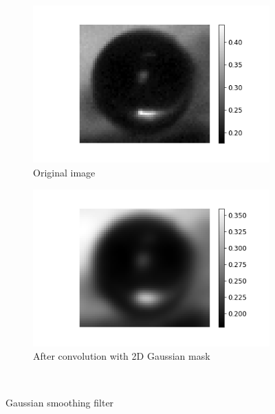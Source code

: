 \begin{figure}
		    \begin{subfigure}[t]{0.3\textwidth}
		        \includegraphics[width=\textwidth]{images/green_one.png}
		        \caption{Original image}
		    \end{subfigure}
			  \begin{subfigure}[t]{0.3\textwidth}
		        \includegraphics[width=\textwidth]{images/green_one_gaussian.png}
		        \caption{After convolution with 2D Gaussian mask}
		    \end{subfigure}
		    ~ %

		    \caption{Gaussian smoothing filter}
		    \label{fig:gauss_intro}
		\end{figure}




